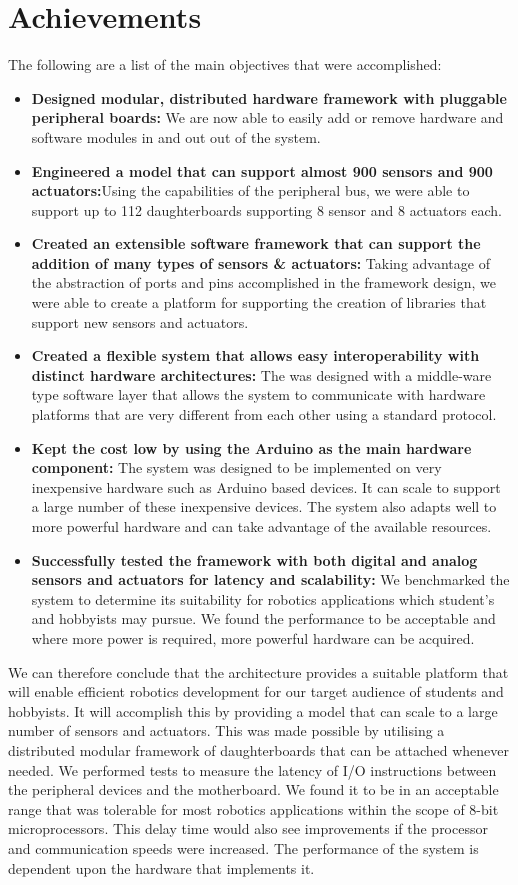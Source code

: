 \section{Achievements}
The following are a list of the main objectives that were accomplished:
\begin{itemize}
\item \textbf{Designed modular, distributed hardware framework with pluggable peripheral boards:} We are now able to easily add or remove hardware and software modules in and out out of the system.
\item \textbf{Engineered a model that can support almost 900 sensors and 900 actuators:}Using the capabilities of the \iic peripheral bus, we were able to support up to 112 daughterboards supporting 8 sensor and 8 actuators each.
\item \textbf{Created an extensible software framework that can support the addition of many types of sensors \& actuators:} Taking advantage of the abstraction of ports and pins accomplished in the framework design, we were able to create a platform for supporting the creation of libraries that support new sensors and actuators.
\item \textbf{Created a flexible system that allows easy interoperability with distinct hardware architectures:} The \xten was designed with a middle-ware type software layer that allows the system to communicate with hardware platforms that are very different from each other using a standard protocol.
\item \textbf{Kept the cost low by using the Arduino as the main hardware component:} The system was designed to be implemented on very inexpensive hardware such as Arduino based devices. It can scale to support a large number of these inexpensive devices. The system also adapts well to more powerful hardware and can take advantage of the available resources.
\item \textbf{Successfully tested the framework with both digital and analog sensors and actuators for latency and scalability:}
We benchmarked the system to determine its suitability for robotics applications which student's and hobbyists may pursue. We found the performance to be acceptable and where more power is required, more powerful hardware can be acquired.
\end{itemize}



We can therefore conclude that the \xten architecture provides a suitable platform that will enable efficient robotics development for our target audience of students and hobbyists. It will accomplish this by providing a model that can scale to a large number of sensors and actuators. This was made possible by utilising a distributed modular framework of daughterboards that can be attached whenever needed. We performed tests to measure the latency of I/O instructions between the peripheral devices and the motherboard. We found it to be in an acceptable range that was tolerable for most robotics applications within the scope of 8-bit microprocessors. This delay time would also see improvements if the processor and communication speeds were increased. The performance of the system is dependent upon the hardware that implements it.

